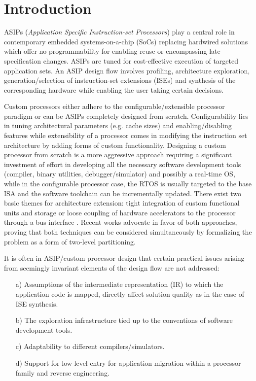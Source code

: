 \documentclass{comjnl}
\begin{document}
\section{Introduction}
\label{Sec:Intro}
{ASIPs} (\emph{Application Specific Instruction-set Processors}) play a central role in contemporary embedded systems-on-a-chip (SoCs) replacing hardwired solutions which offer no programmability for enabling reuse or encompassing late specification changes. ASIPs are tuned for cost-effective execution of targeted application sets. An ASIP design flow involves profiling, architecture exploration, generation/selection of instruction-set extensions (ISEs) and synthesis of the corresponding hardware while enabling the user taking certain decisions. 

Custom processors either adhere to the configurable/extensible processor paradigm \cite{ARC,Gonzalez00} or can be ASIPs completely designed from scratch. Configurability lies in tuning architectural parameters (e.g. cache sizes) and enabling/disabling features \cite{Yiannacouras06} while extensibility of a processor comes in modifying the instruction set architecture by adding forms of custom functionality. Designing a custom processor from scratch is a more aggressive approach requiring a significant investment of effort in developing all the necessary software development tools (compiler, binary utilities, debugger/simulator) and possibly a real-time OS, while in the configurable processor case, the RTOS is usually targeted to the base ISA and the software toolchain can be incrementally updated. There exist two basic themes for architecture extension: tight integration of custom functional units and storage \cite{NiosII} or loose coupling of hardware accelerators 
to the processor through a bus interface \cite{MicroBlaze}. Recent works \cite{Sirowy07} 
advocate in favor of both approaches, proving that both techniques can be considered 
simultaneously by formalizing the problem as a form of two-level partitioning. 

It is often in ASIP/custom processor design that certain practical issues arising from seemingly invariant elements of the design flow are not addressed:
\begin{enumerate}
\item[a)] {Assumptions of the intermediate representation (IR) to which the application code is mapped, directly affect solution quality as in the case of ISE synthesis.} 
\item[b)] {The exploration infrastructure tied up to the conventions of software development tools.} 
\item[c)] {Adaptability to different compilers/simulators.}
\item[d)] {Support for low-level entry for application migration within a processor family and reverse engineering.}
\end{enumerate}
\end{document}

